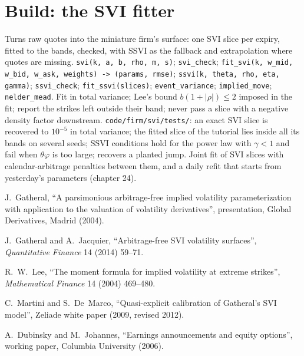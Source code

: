 \section{Build: the SVI fitter}\label{bld:dv:parametrising-the-surface:svi}

\begin{build}
 Turns raw quotes into the miniature firm's surface: one SVI slice per expiry, fitted to
the bands, checked, with SSVI as the fallback and extrapolation where quotes are missing.
 \texttt{svi(k, a, b, rho, m, s)}; \texttt{svi\_check}; \texttt{fit\_svi(k, w\_mid,
w\_bid, w\_ask, weights) -> (params, rmse)}; \texttt{ssvi(k, theta, rho, eta, gamma)};
\texttt{ssvi\_check}; \texttt{fit\_ssvi(slices)}; \texttt{event\_variance}; \texttt{implied\_move};
\texttt{nelder\_mead}.
 Fit in total variance; Lee's bound $b(1+|\rho|)\le2$ imposed in the fit; report the
strikes left outside their band; never pass a slice with a negative density factor downstream.
 \texttt{code/firm/svi/tests/}: an exact SVI slice is recovered to
$10^{-5}$ in total variance; the fitted slice of the tutorial lies inside all its bands on several
seeds; SSVI conditions hold for the power law with $\gamma<1$ and fail when $\theta\varphi$ is too
large;  recovers a planted jump.
 Joint fit of SVI slices with calendar-arbitrage penalties between them, and a daily
refit that starts from yesterday's parameters (chapter 24).
\end{build}

\begin{omsources}
\item J.~Gatheral, ``A parsimonious arbitrage-free implied volatility parameterization with
application to the valuation of volatility derivatives'', presentation, Global Derivatives, Madrid
(2004).
\item J.~Gatheral and A.~Jacquier, ``Arbitrage-free SVI volatility surfaces'', \emph{Quantitative
Finance} 14 (2014) 59--71.
\item R.~W.~Lee, ``The moment formula for implied volatility at extreme strikes'', \emph{Mathematical
Finance} 14 (2004) 469--480.
\item C.~Martini and S.~De~Marco, ``Quasi-explicit calibration of Gatheral's SVI model'', Zeliade
white paper (2009, revised 2012).
\item A.~Dubinsky and M.~Johannes, ``Earnings announcements and equity options'', working paper,
Columbia University (2006).
\end{omsources}

